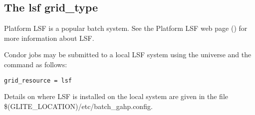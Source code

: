 
\subsection{\label{sec:LSF}The lsf grid\_type }

Platform LSF is a popular batch system. See the Platform LSF web page
()
for more information about LSF.

Condor jobs may be submitted to a local LSF system
using the  universe and the
 command as follows:
\begin{verbatim}
grid_resource = lsf
\end{verbatim}

Details on where LSF is installed on the local system are
given in the file \$(GLITE\_LOCATION)/etc/batch\_gahp.config.
